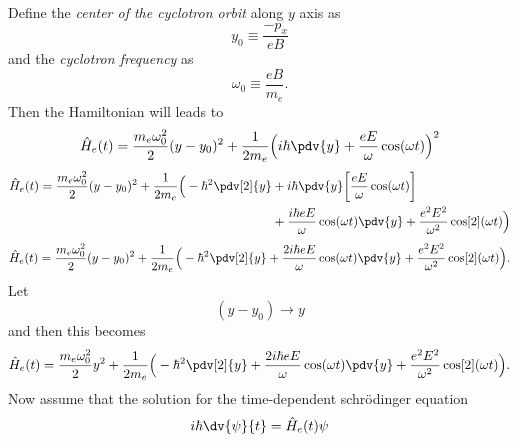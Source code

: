 Define the \textit{center of the cyclotron orbit} along $y$ axis as
\begin{equation} \label{1.11}
  y_0 \equiv \frac{-p_x}{eB}
\end{equation}
and the \textit{cyclotron frequency} as
\begin{equation} \label{1.12}
  \omega_0 \equiv \frac{eB}{m_e}.
\end{equation}
Then the Hamiltonian will leads to
\begin{equation} \label{1.13}
    \hat{H}_e(t) =
      \frac{m_e \omega_0^2}{2}(y-y_0)^2 +
      \frac{1}{2m_e}\Big(i\hbar \pdv{y}+\frac{eE}{\omega}\cos(\omega t)\Big)^2
\end{equation}
\begin{equation} \label{1.14}
  \begin{aligned}
    \hat{H}_e(t) =
      \frac{m_e \omega_0^2}{2}(y-y_0)^2 +
      \frac{1}{2m_e}\Big(
      -\hbar^2 \pdv[2]{y} & +
      i\hbar \pdv{y}\bigg[\frac{eE}{\omega}\cos(\omega t) \bigg] \\ & +
      \frac{i\hbar eE}{\omega}\cos(\omega t) \pdv{y}+
      \frac{e^2E^2}{\omega^2}\cos[2](\omega t)
      \Big)
  \end{aligned}
\end{equation}
\begin{equation} \label{1.15}
  \begin{aligned}
    \hat{H}_e(t) =
      \frac{m_e \omega_0^2}{2}(y-y_0)^2 +
      \frac{1}{2m_e}\Big(
      -\hbar^2 \pdv[2]{y} +
      \frac{2i\hbar eE}{\omega}\cos(\omega t) \pdv{y}+
      \frac{e^2E^2}{\omega^2}\cos[2](\omega t)
      \Big).
  \end{aligned}
\end{equation}
Let
\begin{equation} \label{1.16}
    (y - y_0) \rightarrow y
\end{equation}
and then this becomes
\begin{equation} \label{1.17}
  \begin{aligned}
    \hat{H}_e(t) =
      \frac{m_e \omega_0^2}{2}y^2 +
      \frac{1}{2m_e}\Big(
      -\hbar^2 \pdv[2]{y} +
      \frac{2i\hbar eE}{\omega}\cos(\omega t) \pdv{y}+
      \frac{e^2E^2}{\omega^2}\cos[2](\omega t)
      \Big).
  \end{aligned}
\end{equation}
Now assume that the solution for the time-dependent schrödinger equation
\begin{equation} \label{1.18}
    i \hbar \dv{\psi}{t} = \hat{H}_e(t)\psi
\end{equation}
